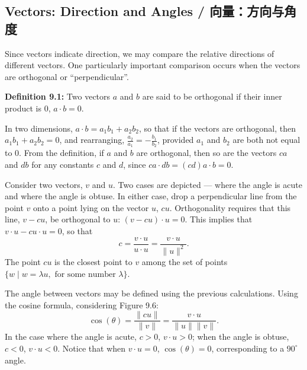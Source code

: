 \subsection{Vectors: Direction and Angles / 向量：方向与角度}

\begin{original}
Since vectors indicate direction, we may compare the relative directions of different vectors. One particularly important comparison occurs when the vectors are orthogonal or ``perpendicular''.

\textbf{Definition 9.1:} Two vectors $a$ and $b$ are said to be orthogonal if their inner product is 0, $a \cdot b = 0$.

In two dimensions, $a \cdot b = a_1 b_1 + a_2 b_2$, so that if the vectors are orthogonal, then $a_1 b_1 + a_2 b_2 = 0$, and rearranging, $\frac{a_2}{a_1} = -\frac{b_1}{b_2}$, provided $a_1$ and $b_2$ are both not equal to 0. From the definition, if $a$ and $b$ are orthogonal, then so are the vectors $c a$ and $d b$ for any constants $c$ and $d$, since $c a \cdot d b = (cd) a \cdot b = 0$.

Consider two vectors, $v$ and $u$. Two cases are depicted --- where the angle is acute and where the angle is obtuse. In either case, drop a perpendicular line from the point $v$ onto a point lying on the vector $u$, $c u$. Orthogonality requires that this line, $v - c u$, be orthogonal to $u$: $(v - c u) \cdot u = 0$. This implies that $v \cdot u - c u \cdot u = 0$, so that
\[
c = \frac{v \cdot u}{u \cdot u} = \frac{v \cdot u}{\|u\|^2}.
\]
The point $c u$ is the closest point to $v$ among the set of points $\{w \mid w = \lambda u, \text{ for some number } \lambda\}$.

The angle between vectors may be defined using the previous calculations. Using the cosine formula, considering Figure 9.6:
\[
\cos(\theta) = \frac{\|c u\|}{\|v\|} = \frac{v \cdot u}{\|u\| \|v\|}.
\]
In the case where the angle is acute, $c > 0$, $v \cdot u > 0$; when the angle is obtuse, $c < 0$, $v \cdot u < 0$. Notice that when $v \cdot u = 0$, $\cos(\theta) = 0$, corresponding to a $90^\circ$ angle.
\end{original}
